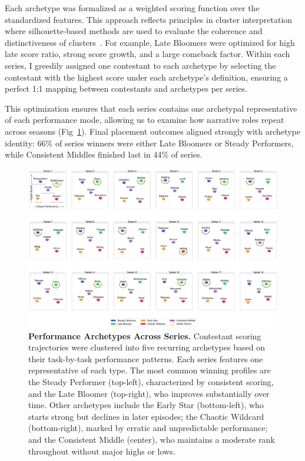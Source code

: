 \documentclass[10pt,letterpaper]{article}
\begin{document}
Each archetype was formalized as a weighted scoring function over the standardized features. This approach reflects principles in cluster interpretation where silhouette-based methods are used to evaluate the coherence and distinctiveness of clusters~\cite{Rousseeuw1987}. For example, Late Bloomers were optimized for high late score ratio, strong score growth, and a large comeback factor. Within each series, I greedily assigned one contestant to each archetype by selecting the contestant with the highest score under each archetype’s definition, ensuring a perfect 1:1 mapping between contestants and archetypes per series.

This optimization ensures that each series contains one archetypal representative of each performance mode, allowing us to examine how narrative roles repeat across seasons (Fig~\ref{fig:performance_archetypes}). Final placement outcomes aligned strongly with archetype identity: 66\% of series winners were either Late Bloomers or Steady Performers, while Consistent Middles finished last in 44\% of series.

\begin{figure}[!h]
\centering
\includegraphics[width=\linewidth]{FiguresPNG/Fig7.png}
\caption{{\bf Performance Archetypes Across Series.}
Contestant scoring trajectories were clustered into five recurring archetypes based on their task-by-task performance patterns. Each series features one representative of each type. The most common winning profiles are the Steady Performer (top-left), characterized by consistent scoring, and the Late Bloomer (top-right), who improves substantially over time. Other archetypes include the Early Star (bottom-left), who starts strong but declines in later episodes; the Chaotic Wildcard (bottom-right), marked by erratic and unpredictable performance; and the Consistent Middle (center), who maintains a moderate rank throughout without major highs or lows.}
\label{fig:performance_archetypes}
\end{figure}
\FloatBarrier
\end{document}
